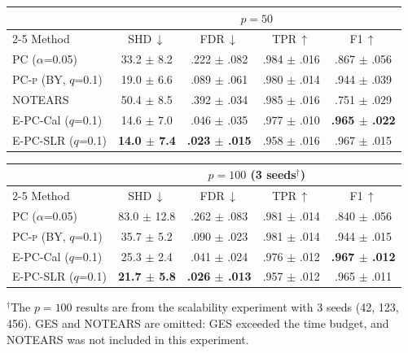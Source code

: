 \documentclass[11pt]{article}
\newcommand{\epc}{\textsc{E-PC}}
\newcommand{\pcp}{\textsc{PC-p}}
\begin{document}
\begin{table}[t]
\vspace{0.5em}

\begin{tabular}{l cccc}
\toprule
 & \multicolumn{4}{c}{$p = 50$} \\
\cmidrule(lr){2-5}
Method & SHD\,$\downarrow$ & FDR\,$\downarrow$ & TPR\,$\uparrow$ & F1\,$\uparrow$ \\
\midrule
PC ($\alpha$=0.05) & 33.2 $\pm$ 8.2 & .222 $\pm$ .082 & .984 $\pm$ .016 & .867 $\pm$ .056 \\
\pcp{} (BY, $q$=0.1) & 19.0 $\pm$ 6.6 & .089 $\pm$ .061 & .980 $\pm$ .014 & .944 $\pm$ .039 \\
NOTEARS & 50.4 $\pm$ 8.5 & .392 $\pm$ .034 & .985 $\pm$ .016 & .751 $\pm$ .029 \\
\epc{}-Cal ($q$=0.1) & 14.6 $\pm$ 7.0 & .046 $\pm$ .035 & .977 $\pm$ .010 & \textbf{.965 $\pm$ .022} \\
\epc{}-SLR ($q$=0.1) & \textbf{14.0 $\pm$ 7.4} & \textbf{.023 $\pm$ .015} & .958 $\pm$ .016 & .967 $\pm$ .015 \\
\bottomrule
\end{tabular}

\vspace{0.5em}

\begin{tabular}{l cccc}
\toprule
 & \multicolumn{4}{c}{$p = 100$ (3 seeds$^\dagger$)} \\
\cmidrule(lr){2-5}
Method & SHD\,$\downarrow$ & FDR\,$\downarrow$ & TPR\,$\uparrow$ & F1\,$\uparrow$ \\
\midrule
PC ($\alpha$=0.05) & 83.0 $\pm$ 12.8 & .262 $\pm$ .083 & .981 $\pm$ .014 & .840 $\pm$ .056 \\
\pcp{} (BY, $q$=0.1) & 35.7 $\pm$ 5.2 & .090 $\pm$ .023 & .981 $\pm$ .014 & .944 $\pm$ .015 \\
\epc{}-Cal ($q$=0.1) & 25.3 $\pm$ 2.4 & .041 $\pm$ .024 & .976 $\pm$ .012 & \textbf{.967 $\pm$ .012} \\
\epc{}-SLR ($q$=0.1) & \textbf{21.7 $\pm$ 5.8} & \textbf{.026 $\pm$ .013} & .957 $\pm$ .012 & .965 $\pm$ .011 \\
\bottomrule
\end{tabular}

\vspace{0.3em}
{\footnotesize $^\dagger$The $p=100$ results are from the scalability experiment with 3 seeds (42, 123, 456). GES and NOTEARS are omitted: GES exceeded the time budget, and NOTEARS was not included in this experiment.}
\end{table}
\end{document}
